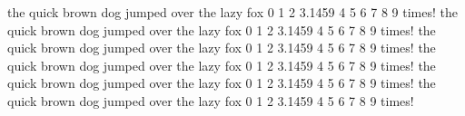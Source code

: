 \documentclass[nosep,note,a4paper,12pt]{fax}
\begin{document}
the quick brown dog jumped over the lazy fox 0 1 2 3.1459 4 5 6 7 8 9 times!
\newpage
the quick brown dog jumped over the lazy fox 0 1 2 3.1459 4 5 6 7 8 9 times!
\newpage
the quick brown dog jumped over the lazy fox 0 1 2 3.1459 4 5 6 7 8 9 times!
\newpage
the quick brown dog jumped over the lazy fox 0 1 2 3.1459 4 5 6 7 8 9 times!
\newpage
the quick brown dog jumped over the lazy fox 0 1 2 3.1459 4 5 6 7 8 9 times!
\newpage
the quick brown dog jumped over the lazy fox 0 1 2 3.1459 4 5 6 7 8 9 times!
\newpage
\end{document}
